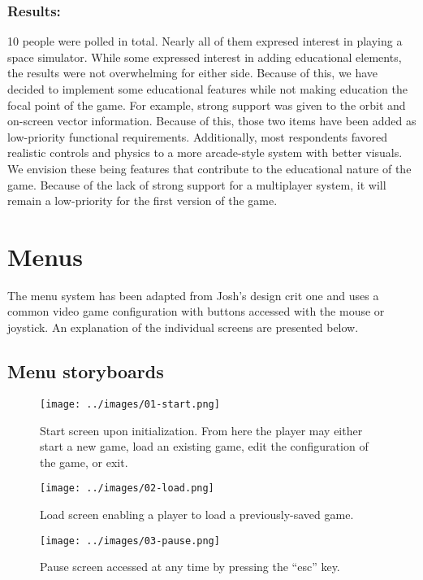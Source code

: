 \subsubsection*{Results:}

  \parbox[t]{6.5in}{10 people were polled in total. Nearly all of them expresed interest in playing a space simulator. While some expressed interest in adding educational elements, the results were not overwhelming for either side. Because of this, we have decided to implement some educational features while not making education the focal point of the game. For example, strong support was given to the orbit and on-screen vector information. Because of this, those two items have been added as low-priority functional requirements. Additionally, most respondents favored realistic controls and physics to a more arcade-style system with better visuals. We envision these being features that contribute to the educational nature of the game. Because of the lack of strong support for a multiplayer system, it will remain a low-priority for the first version of the game.}

\section*{Menus}

The menu system has been adapted from Josh's design crit one and uses a common video game configuration with buttons accessed with the mouse or joystick.  An explanation of the individual screens are presented below.

\subsection*{Menu storyboards}

\begin{figure}[H]
  \centering
  \texttt{[image: ../images/01-start.png]}
  \caption{Start screen upon initialization.  From here the player may either start a new game, load an existing game, edit the configuration of the game, or exit.}
\end{figure}

\begin{figure}[H]
  \centering
  \texttt{[image: ../images/02-load.png]}
  \caption{Load screen enabling a player to load a previously-saved game.}
\end{figure}

\begin{figure}[H]
  \centering
  \texttt{[image: ../images/03-pause.png]}
  \caption{Pause screen accessed at any time by pressing the ``esc'' key.}
\end{figure}

